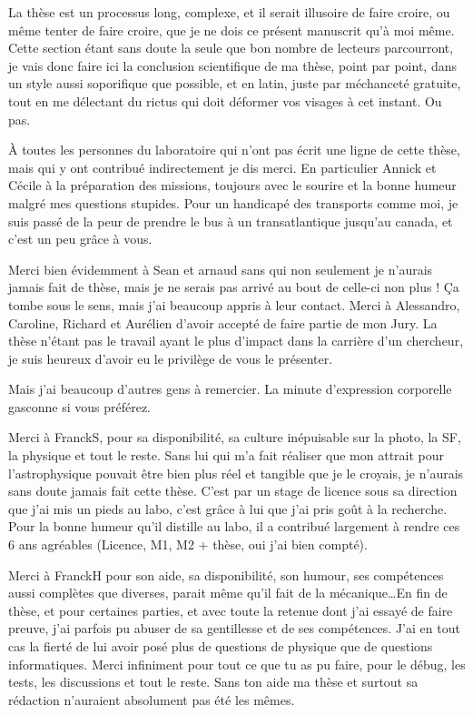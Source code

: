La thèse est un processus long, complexe, et il serait illusoire de faire croire, ou même tenter de faire croire, que je ne dois
ce présent manuscrit qu'à moi même. Cette section étant sans doute la seule que bon nombre de lecteurs parcourront, je vais donc
faire ici la conclusion scientifique de ma thèse, point par point, dans un style aussi soporifique que possible, et en latin,
juste par méchanceté gratuite, tout en me délectant du rictus qui doit déformer vos visages à cet instant. Ou pas.

À toutes les personnes du laboratoire qui n'ont pas écrit une ligne de cette thèse, mais qui y ont contribué indirectement je
dis merci. En particulier Annick et Cécile à la préparation des missions, toujours avec le sourire et la bonne humeur malgré mes
questions stupides. Pour un handicapé des transports comme moi, je suis passé de la peur de prendre le bus à un transatlantique
jusqu'au canada, et c'est un peu grâce à vous. 

Merci bien évidemment à Sean et arnaud sans qui non seulement je n'aurais jamais fait de thèse, mais je ne serais pas arrivé au
bout de celle-ci non plus ! Ça tombe sous le sens, mais j'ai beaucoup appris à leur contact. Merci à Alessandro, Caroline,
Richard et Aurélien d'avoir accepté de faire partie de mon Jury. La thèse n'étant pas le travail ayant le plus d'impact dans la
carrière d'un chercheur, je suis heureux d'avoir eu le privilège de vous le présenter.

Mais j'ai beaucoup d'autres gens à remercier. La minute d'expression corporelle gasconne si vous préférez. 

\bigskip

Merci à FranckS, pour sa disponibilité, sa culture inépuisable sur la photo, la SF, la physique et tout le reste. Sans lui qui
m'a fait réaliser que mon attrait pour l'astrophysique pouvait être bien plus réel et tangible que je le croyais, je n'aurais
sans doute jamais fait cette thèse. C'est par un stage de licence sous sa direction que j'ai mis un pieds au labo, c'est grâce à
lui que j'ai pris goût à la recherche. Pour la bonne humeur qu'il distille au labo, il a contribué largement à rendre ces 6 ans
agréables (Licence, M1, M2 + thèse, oui j'ai bien compté).

Merci à FranckH pour son aide, sa disponibilité, son humour, ses compétences aussi complètes que diverses, parait même qu'il
fait de la mécanique\dots En fin de thèse, et pour certaines parties, et avec toute la retenue dont j'ai essayé de faire preuve,
j'ai parfois pu abuser de sa gentillesse et de ses compétences. J'ai en tout cas la fierté de lui avoir posé plus de questions
de physique que de questions informatiques. Merci infiniment pour tout ce que tu as pu faire, pour le débug, les tests, les
discussions et tout le reste. Sans ton aide ma thèse et surtout sa rédaction n'auraient absolument pas été les mêmes. 

